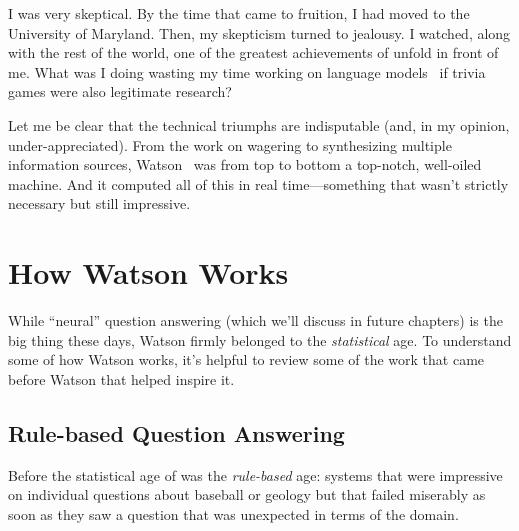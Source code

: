 I was very skeptical.
%
By the time that \watson{} came to fruition, I had moved to the
University of Maryland.
%
Then, my skepticism turned to jealousy.
%
I watched, along with the rest of the world, one of the greatest
achievements of  unfold in front of me.
%
What was I doing wasting my time working on language
models~\citep{boyd-graber-10:linguistic} if trivia games were also
legitimate research?

Let me be clear that the technical triumphs are indisputable (and, in
my opinion, under-appreciated).
%
From the work on wagering to synthesizing multiple information sources,
Watson~\citep{ferruci-10} was from top to bottom a top-notch,
well-oiled machine.
%
And it computed all of this in real time---something that wasn't
strictly necessary but still impressive.

\section{How Watson Works}

While ``neural'' question answering (which we'll discuss in future
chapters) is the big thing these days, Watson firmly belonged to the
\emph{statistical} age.
%
To understand some of how Watson works, it's helpful to review some of
the work that came before Watson that helped inspire it.

\subsection{Rule-based Question Answering}

Before the statistical age of  was the \emph{rule-based}
age: systems that were impressive on individual questions about
baseball or geology but that failed miserably as soon as they saw a question
that was unexpected in terms of the domain.

